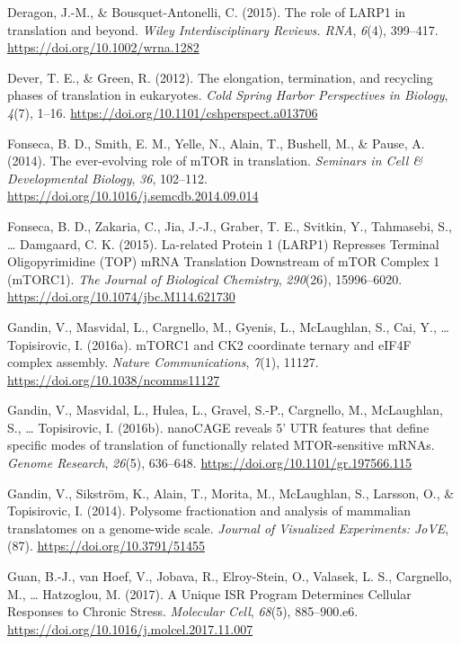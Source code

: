 \documentclass[12pt,openany]{book}
\begin{document}
\hypertarget{ref-Deragon2015}{}
Deragon, J.-M., \& Bousquet-Antonelli, C. (2015). The role of LARP1 in
translation and beyond. \emph{Wiley Interdisciplinary Reviews. RNA},
\emph{6}(4), 399--417. \url{https://doi.org/10.1002/wrna.1282}

\hypertarget{ref-Dever2012}{}
Dever, T. E., \& Green, R. (2012). The elongation, termination, and
recycling phases of translation in eukaryotes. \emph{Cold Spring Harbor
Perspectives in Biology}, \emph{4}(7), 1--16.
\url{https://doi.org/10.1101/cshperspect.a013706}

\hypertarget{ref-Fonseca2014}{}
Fonseca, B. D., Smith, E. M., Yelle, N., Alain, T., Bushell, M., \&
Pause, A. (2014). The ever-evolving role of mTOR in translation.
\emph{Seminars in Cell \& Developmental Biology}, \emph{36}, 102--112.
\url{https://doi.org/10.1016/j.semcdb.2014.09.014}

\hypertarget{ref-Fonseca2015}{}
Fonseca, B. D., Zakaria, C., Jia, J.-J., Graber, T. E., Svitkin, Y.,
Tahmasebi, S., \ldots{} Damgaard, C. K. (2015). La-related Protein 1
(LARP1) Represses Terminal Oligopyrimidine (TOP) mRNA Translation
Downstream of mTOR Complex 1 (mTORC1). \emph{The Journal of Biological
Chemistry}, \emph{290}(26), 15996--6020.
\url{https://doi.org/10.1074/jbc.M114.621730}

\hypertarget{ref-Gandin2016}{}
Gandin, V., Masvidal, L., Cargnello, M., Gyenis, L., McLaughlan, S.,
Cai, Y., \ldots{} Topisirovic, I. (2016a). mTORC1 and CK2 coordinate
ternary and eIF4F complex assembly. \emph{Nature Communications},
\emph{7}(1), 11127. \url{https://doi.org/10.1038/ncomms11127}

\hypertarget{ref-Gandin2016a}{}
Gandin, V., Masvidal, L., Hulea, L., Gravel, S.-P., Cargnello, M.,
McLaughlan, S., \ldots{} Topisirovic, I. (2016b). nanoCAGE reveals 5'
UTR features that define specific modes of translation of functionally
related MTOR-sensitive mRNAs. \emph{Genome Research}, \emph{26}(5),
636--648. \url{https://doi.org/10.1101/gr.197566.115}

\hypertarget{ref-Gandin2014}{}
Gandin, V., Sikström, K., Alain, T., Morita, M., McLaughlan, S.,
Larsson, O., \& Topisirovic, I. (2014). Polysome fractionation and
analysis of mammalian translatomes on a genome-wide scale. \emph{Journal
of Visualized Experiments: JoVE}, (87).
\url{https://doi.org/10.3791/51455}

\hypertarget{ref-Guan2017}{}
Guan, B.-J., van Hoef, V., Jobava, R., Elroy-Stein, O., Valasek, L. S.,
Cargnello, M., \ldots{} Hatzoglou, M. (2017). A Unique ISR Program
Determines Cellular Responses to Chronic Stress. \emph{Molecular Cell},
\emph{68}(5), 885--900.e6.
\url{https://doi.org/10.1016/j.molcel.2017.11.007}
\end{document}
